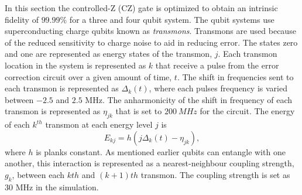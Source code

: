 In this section the controlled-Z (CZ) gate is optimized to obtain an intrinsic fidelity of $99.99\%$ for a three and four qubit system. The qubit systems use superconducting charge qubits known as \textit{transmons}. Transmons are used because of the reduced sensitivity to charge
noise to aid in reducing error. The states zero and one are represented as energy states of the transmon, $j$. Each transmon location in the system is represented as $k$ that receive a pulse from the error correction circuit over a given amount of time, $t$. The shift in frequencies sent to each transmon is represented as $\Delta_k(t)$, where each pulses frequency is varied between $-2.5$ and $2.5$ MHz. The anharmonicity of the shift in frequency of each transmon is represented as $\eta_{jk}$ that is set to $200\ MHz$ for the circuit. The
energy of each $k^{th}$ transmon at each energy level $j$ is
\begin{equation}
    \label{eq:energy}
    E_{kj} = h(j\Delta_k(t)-\eta_{jk}),
\end{equation}
where $h$ is planks constant. As mentioned earlier qubits can entangle with one another, this interaction is represented as a nearest-neighbour coupling strength, $g_k$, between each $kth$ and $(k+1)th$ transmon. The coupling strength is set as $30$ MHz in the simulation.  

